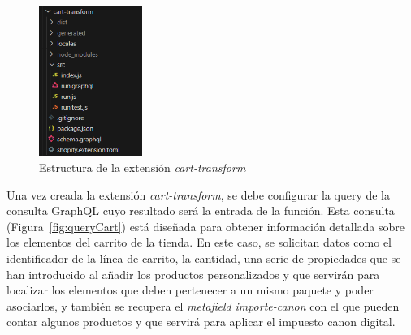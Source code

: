 \documentclass[11pt]{article}
\begin{document}
\begin{figure}[H]
    \centering
    \includegraphics[width=0.3\textwidth]{imagenes-tema/estructuraCartTransform.png}
    \caption{\label{fig:estructuracarttrans} Estructura de la extensión \textit{cart-transform}}
    \vspace{\fill}
\end{figure}

Una vez creada la extensión \textit{cart-transform}, se debe configurar la query de la consulta GraphQL cuyo resultado será la entrada de la función. Esta consulta (Figura~\ref{fig:queryCart}) está diseñada para obtener
información detallada sobre los elementos del carrito de la tienda. En este caso, se solicitan datos como el identificador de la línea de carrito, la cantidad, una serie de propiedades que se han introducido al añadir los productos personalizados 
y que servirán para localizar los elementos que deben pertenecer a un mismo paquete y poder asociarlos, y también se recupera el 
\textit{metafield} \textit{importe-canon} con el que pueden contar algunos productos y que servirá para aplicar el impuesto canon digital.
\end{document}
